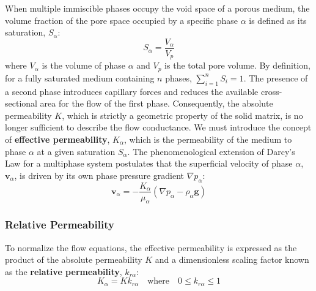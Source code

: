 When multiple immiscible phases occupy the void space of a porous medium, the volume fraction of the pore space occupied by a specific phase $\alpha$ is defined as its saturation, $S_\alpha$:
\begin{equation}
    S_\alpha = \frac{V_\alpha}{V_p}
\end{equation}
where $V_\alpha$ is the volume of phase $\alpha$ and $V_p$ is the total pore volume.
By definition, for a fully saturated medium containing $n$ phases, $\sum_{i=1}^n S_i = 1$.
The presence of a second phase introduces capillary forces and reduces the available cross-sectional area for the flow of the first phase.
Consequently, the absolute permeability $K$, which is strictly a geometric property of the solid matrix, is no longer sufficient to describe the flow conductance.
We must introduce the concept of \textbf{effective permeability}, $K_\alpha$, which is the permeability of the medium to phase $\alpha$ at a given saturation $S_\alpha$.
The phenomenological extension of Darcy's Law for a multiphase system postulates that the superficial velocity of phase $\alpha$, $\mathbf{v}_\alpha$, is driven by its own phase pressure gradient $\nabla p_\alpha$:
\begin{equation}
    \mathbf{v}_\alpha = -\frac{K_\alpha}{\mu_\alpha} (\nabla p_\alpha - \rho_\alpha \mathbf{g})
\end{equation}

\subsubsection{Relative Permeability}

To normalize the flow equations, the effective permeability is expressed as the product of the absolute permeability $K$ and a dimensionless scaling factor known as the \textbf{relative permeability}, $k_{r\alpha}$:
\begin{equation}
    K_\alpha = K k_{r\alpha} \quad \text{where} \quad 0 \leq k_{r\alpha} \leq 1
\end{equation}


